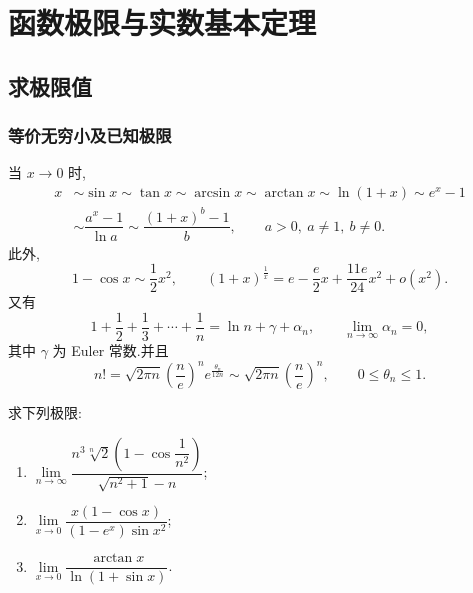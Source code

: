 \setcounter{chapter}{1}
\pagestyle{fancy}

\chapter{函数极限与实数基本定理}


\section{求极限值}


\subsection{等价无穷小及已知极限}

\begin{proposition}
    当 $x\to0$ 时,
    \[
        \begin{aligned}
            x & \sim\sin x\sim\tan x\sim\arcsin x\sim\arctan x\sim\ln(1+x)\sim e^x-1 \\
              & \sim\dfrac{a^x-1}{\ln a}
            \sim\dfrac{(1+x)^b-1}{b},
            \qquad a>0,\ a\neq1,\ b\neq0.
        \end{aligned}
    \]
    此外,
    \[
        1-\cos x\sim\dfrac{1}{2}x^2,
        \qquad
        (1+x)^{\frac{1}{x}}
        =e-\dfrac{e}{2}x+\dfrac{11e}{24}x^2+o(x^2).
    \]
    又有
    \[
        1+\dfrac{1}{2}+\dfrac{1}{3}+\cdots+\dfrac{1}{n}
        =\ln n+\gamma+\alpha_n,
        \qquad
        \lim\limits_{n\to\infty}\alpha_n=0,
    \]
    其中 $\gamma$ 为 Euler 常数.并且
    \[
        n!=\sqrt{2\pi n}\left(\dfrac{n}{e}\right)^n
        e^{\frac{\theta_n}{12n}}
        \sim
        \sqrt{2\pi n}\left(\dfrac{n}{e}\right)^n,
        \qquad 0\leq\theta_n\leq1.
    \]
\end{proposition}

\begin{example}
    求下列极限:
    \begin{enumerate}
        \item $\displaystyle
                  \lim\limits_{n\to\infty}
                  \dfrac{n^3\sqrt[n]{2}\left(1-\cos\dfrac{1}{n^2}\right)}{\sqrt{n^2+1}-n}$;
        \item $\displaystyle
                  \lim\limits_{x\to0}
                  \dfrac{x(1-\cos x)}{(1-e^x)\sin x^2}$;
        \item $\displaystyle
                  \lim\limits_{x\to0}
                  \dfrac{\arctan x}{\ln(1+\sin x)}$.
    \end{enumerate}
\end{example}
\exampleblank

